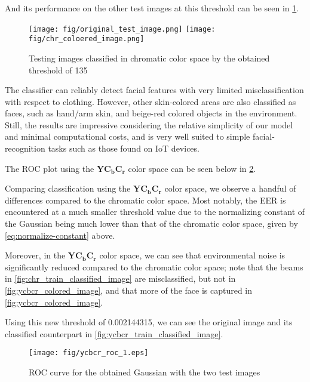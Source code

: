 \documentclass[headings=optiontoheadandtoc,listof=totoc,parskip=full]{scrartcl}
\begin{document}
And its performance on the other test images at this threshold can be seen in \cref{fig:chr_classified_image}.

%
\begin{figure}[H]
    \centering
    \texttt{[image: fig/original\_test\_image.png]}
    \texttt{[image: fig/chr\_coloered\_image.png]}
    \caption{Testing images classified in chromatic color space by the obtained threshold of 135}
    \label{fig:chr_classified_image}
\end{figure}


The classifier can reliably detect facial features with very limited misclassification with respect to clothing. However, other skin-colored areas are also classified as faces, such as hand/arm skin, and beige-red colored objects in the environment. Still, the results are impressive considering the relative simplicity of our model and minimal computational costs, and is very well suited to simple facial-recognition tasks such as those found on IoT devices.

The ROC plot using the $\mathbf{YC_bC_r}$ color space can be seen below in \cref{fig:ycbcr_roc_1}.

Comparing classification using the  $\mathbf{YC_bC_r}$ color space, we observe a handful of differences compared to the chromatic color space. Most notably, the EER is encountered at a much smaller threshold value due to the normalizing constant of the Gaussian being much lower than that of the chromatic color space, given by \cref{eq:normalize-constant} above.

Moreover, in the $\mathbf{YC_bC_r}$ color space, we can see that environmental noise is significantly reduced compared to the chromatic color space; note that the beams in \cref{fig:chr_train_classified_image} are misclassified, but not in \cref{fig:ycbcr_colored_image}, and that more of the face is captured in \cref{fig:ycbcr_colored_image}.

Using this new threshold of 0.002144315, we can see the original image and its classified counterpart in \cref{fig:ycbcr_train_classified_image}.

%
\begin{figure}[H]
    \centering
    \texttt{[image: fig/ycbcr\_roc\_1.eps]}
    \caption{ROC curve for the obtained Gaussian with the two test images}
    \label{fig:ycbcr_roc_1}
\end{figure}
\end{document}
